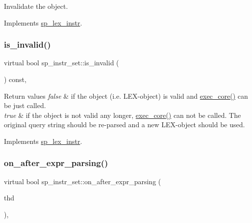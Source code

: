 Invalidate the object. 

Implements \mbox{\hyperlink{classsp__lex__instr_ae9945d69ab5d91d6ce215f194beea882}{sp\+\_\+lex\+\_\+instr}}.

\mbox{\label{classsp__instr__set_af9865816c222a82cb3bad59b428ddf77}} 
\subsubsection{\texorpdfstring{is\+\_\+invalid()}{is\_invalid()}}
{\footnotesize\ttfamily virtual bool sp\+\_\+instr\+\_\+set\+::is\+\_\+invalid (\begin{DoxyParamCaption}{ }\end{DoxyParamCaption}) const\hspace{0.3cm}{\ttfamily [inline]}, {\ttfamily [virtual]}}


\begin{DoxyRetVals}{Return values}
{\em false} & if the object (i.\+e. L\+EX-\/object) is valid and \mbox{\hyperlink{classsp__instr__set_adc6287f3c6cce44e717167cec46a0149}{exec\+\_\+core()}} can be just called.\\
\hline
{\em true} & if the object is not valid any longer, \mbox{\hyperlink{classsp__instr__set_adc6287f3c6cce44e717167cec46a0149}{exec\+\_\+core()}} can not be called. The original query string should be re-\/parsed and a new L\+EX-\/object should be used. \\
\hline
\end{DoxyRetVals}


Implements \mbox{\hyperlink{classsp__lex__instr_a56788cb475ccf94f224816006d9c90e9}{sp\+\_\+lex\+\_\+instr}}.

\mbox{\label{classsp__instr__set_aef30b17435828a33ac1f1e60081bc194}} 
\subsubsection{\texorpdfstring{on\+\_\+after\+\_\+expr\+\_\+parsing()}{on\_after\_expr\_parsing()}}
{\footnotesize\ttfamily virtual bool sp\+\_\+instr\+\_\+set\+::on\+\_\+after\+\_\+expr\+\_\+parsing (\begin{DoxyParamCaption}\item[{T\+HD $\ast$}]{thd }\end{DoxyParamCaption})\hspace{0.3cm}{\ttfamily [inline]}, {\ttfamily [virtual]}}

